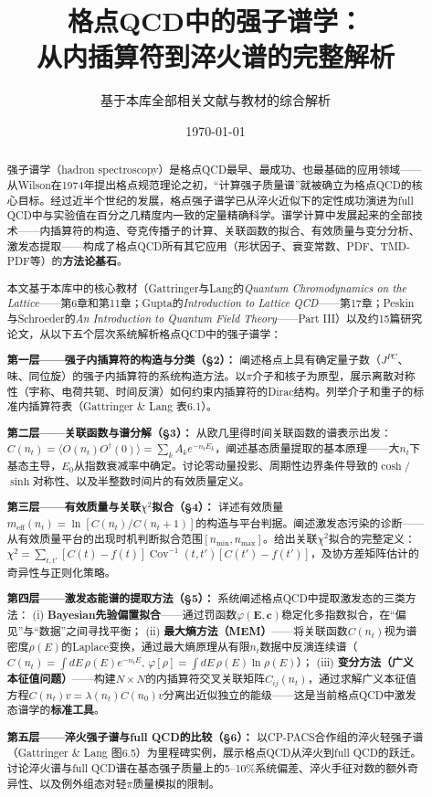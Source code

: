\documentclass[12pt,a4paper]{ctexart}
\title{\heiti 格点QCD中的强子谱学：\\
从内插算符到淬火谱的完整解析}
\author{基于本库全部相关文献与教材的综合解析}
\date{\today}
\theoremstyle{definition}
\begin{document}
\maketitle

\begin{abstract}
\noindent
强子谱学（hadron spectroscopy）是格点QCD最早、最成功、也最基础的应用领域——从Wilson在1974年提出格点规范理论之初，``计算强子质量谱''就被确立为格点QCD的核心目标。经过近半个世纪的发展，格点强子谱学已从淬火近似下的定性成功演进为full QCD中与实验值在百分之几精度内一致的定量精确科学。谱学计算中发展起来的全部技术——内插算符的构造、夸克传播子的计算、关联函数的拟合、有效质量与变分分析、激发态提取——构成了格点QCD所有其它应用（形状因子、衰变常数、PDF、TMD-PDF等）的\textbf{方法论基石}。

本文基于本库中的核心教材（Gattringer与Lang的\textit{Quantum Chromodynamics on the Lattice}——第6章和第11章；Gupta的\textit{Introduction to Lattice QCD}——第17章；Peskin与Schroeder的\textit{An Introduction to Quantum Field Theory}——Part III）以及约15篇研究论文，从以下五个层次系统解析格点QCD中的强子谱学：

\textbf{第一层——强子内插算符的构造与分类（§2）：}
阐述格点上具有确定量子数（$J^{PC}$、味、同位旋）的强子内插算符的系统构造方法。以$\pi$介子和核子为原型，展示离散对称性（宇称、电荷共轭、时间反演）如何约束内插算符的Dirac结构。列举介子和重子的标准内插算符表（Gattringer \& Lang 表6.1）。

\textbf{第二层——关联函数与谱分解（§3）：}
从欧几里得时间关联函数的谱表示出发：$C(n_t) = \langle O(n_t) O^\dagger(0) \rangle = \sum_k A_k e^{-n_t E_k}$，阐述基态质量提取的基本原理——大$n_t$下基态主导，$E_0$从指数衰减率中确定。讨论零动量投影、周期性边界条件导致的$\cosh$/$\sinh$对称性、以及半整数时间片的有效质量定义。

\textbf{第三层——有效质量与关联$\chi^2$拟合（§4）：}
详述有效质量$m_{\text{eff}}(n_t) = \ln[C(n_t)/C(n_t+1)]$的构造与平台判据。阐述激发态污染的诊断——从有效质量平台的出现时机判断拟合范围$[n_{\min}, n_{\max}]$。给出关联$\chi^2$拟合的完整定义：$\chi^2 = \sum_{t,t'}[C(t)-f(t)]\operatorname{Cov}^{-1}(t,t')[C(t')-f(t')]$，及协方差矩阵估计的奇异性与正则化策略。

\textbf{第四层——激发态能谱的提取方法（§5）：}
系统阐述格点QCD中提取激发态的三类方法：
(i) \textbf{Bayesian先验偏置拟合}——通过罚函数$\varphi(\mathbf{E}, \mathbf{c})$稳定化多指数拟合，在``偏见''与``数据''之间寻找平衡；
(ii) \textbf{最大熵方法（MEM）}——将关联函数$C(n_t)$视为谱密度$\rho(E)$的Laplace变换，通过最大熵原理从有限$n_t$数据中反演连续谱（$C(n_t) = \int dE\,\rho(E)e^{-n_t E}$, $\varphi[\rho] = \int dE\,\rho(E)\ln\rho(E)$）；
(iii) \textbf{变分方法（广义本征值问题）}——构建$N\times N$的内插算符交叉关联矩阵$C_{ij}(n_t)$，通过求解广义本征值方程$C(n_t)v = \lambda(n_t)C(n_0)v$分离出近似独立的能级——这是当前格点QCD中激发态谱学的\textbf{标准工具}。

\textbf{第五层——淬火强子谱与full QCD的比较（§6）：}
以CP-PACS合作组的淬火轻强子谱（Gattringer \& Lang 图6.5）为里程碑实例，展示格点QCD从淬火到full QCD的跃迁。讨论淬火谱与full QCD谱在基态强子质量上的5--10\%系统偏差、淬火手征对数的额外奇异性、以及例外组态对轻$\pi$质量模拟的限制。
\end{abstract}
\end{document}
